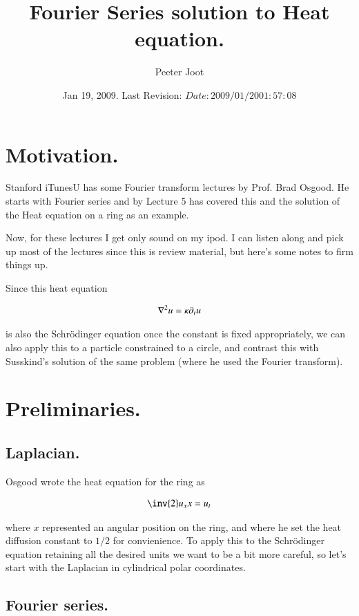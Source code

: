 \documentclass{article}
\title{ Fourier Series solution to Heat equation. }
\author{Peeter Joot}
\date{ Jan 19, 2009.  Last Revision: $Date: 2009/01/20 01:57:08 $ }
\begin{document}
\maketitle{}


\section{ Motivation. }

Stanford iTunesU has some Fourier transform lectures by Prof. Brad Osgood.
He starts with Fourier series and by Lecture 5 has covered this and
the solution of the Heat equation on a ring as an example.

Now, for these lectures I get only sound on my ipod.  I can listen along and
pick up most of the lectures since this is review material, but here's some
notes to firm things up.

Since this heat equation

\begin{align*}
\nabla^2 u = \kappa \partial_t u
\end{align*}

is also the Schr\"{o}dinger equation once the 
constant is fixed appropriately, we can also apply this to a particle
constrained to a circle, and contrast this with Susskind's solution of the
same problem (where he used the Fourier transform).

\section{ Preliminaries. }

\subsection{ Laplacian. }

Osgood wrote the heat equation for the ring as

\begin{align*}
\inv{2} u_xx = u_t
\end{align*}

where $x$ represented an angular position on the ring, and where
he set the heat diffusion constant to $1/2$ for convienience.
To apply this to the Schr\"{o}dinger equation retaining all the desired
units we want to be a bit more careful, so let's start with the Laplacian
in cylindrical polar coordinates.

\subsection{ Fourier series. }

%
%
\end{document}
